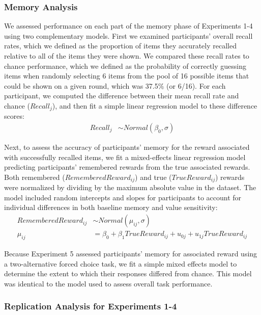 \documentclass[10pt,letterpaper]{article}
\begin{document}
\subsubsection{Memory Analysis}

We assessed performance on each part of the memory phase of Experiments 1-4 using two complementary models. First we examined participants' overall recall rates, which we defined as the proportion of items they accurately recalled relative to all of the items they were shown. We compared these recall rates to chance performance, which we defined as the probability of correctly guessing items when randomly selecting 6 items from the pool of 16 possible items that could be shown on a given round, which was 37.5\% (or 6/16). For each participant, we computed the difference between their mean recall rate and chance ($Recall_j$), and then fit a simple linear regression model to these difference scores:
\begin{align*}
Recall_j &\sim Normal(\beta_0, \sigma)
\end{align*}

Next, to assess the accuracy of participants' memory for the reward associated with successfully recalled items, we fit a mixed-effects linear regression model predicting participants' remembered rewards from the true associated rewards. Both remembered ($RememberedReward_{ij}$) and true ($TrueReward_{ij}$) rewards were normalized by dividing by the maximum absolute value in the dataset. The model included random intercepts and slopes for participants to account for individual differences in both baseline memory and value sensitivity:
\begin{align*}
RememberedReward_{ij} &\sim Normal(\mu_{ij}, \sigma) \\
\mu_{ij} &= \beta_0 + \beta_1TrueReward_{ij} \nonumber + u_{0j} + u_{1j}TrueReward_{ij}
\end{align*}

Because Experiment 5 assessed participants' memory for associated reward using a two-alternative forced choice task, we fit a simple mixed effects model to determine the extent to which their responses differed from chance. This model was identical to the model used to assess overall task performance.

\subsubsection{Replication Analysis for Experiments 1-4}
\end{document}
